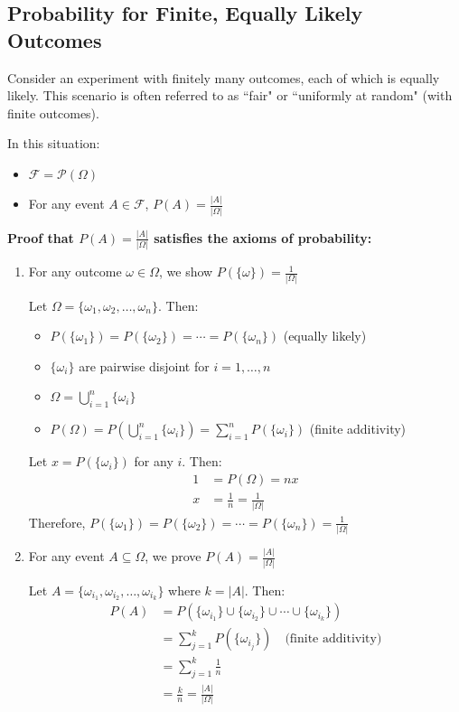 \documentclass{article}
\begin{document}
\subsection*{Probability for Finite, Equally Likely Outcomes}

Consider an experiment with finitely many outcomes, each of which is equally likely. This scenario is often referred to as ``fair" or ``uniformly at random" (with finite outcomes).

In this situation:
\begin{itemize}
    \item $\mathcal{F} = \mathcal{P}(\Omega)$
    \item For any event $A \in \mathcal{F}$, $P(A) = \frac{|A|}{|\Omega|}$
\end{itemize}

\textbf{Proof that $P(A) = \frac{|A|}{|\Omega|}$ satisfies the axioms of probability:}

\begin{enumerate}
    \item For any outcome $\omega \in \Omega$, we show $P(\{\omega\}) = \frac{1}{|\Omega|}$
    
    Let $\Omega = \{\omega_1, \omega_2, \ldots, \omega_n\}$. Then:
    \begin{itemize}
        \item $P(\{\omega_1\}) = P(\{\omega_2\}) = \cdots = P(\{\omega_n\})$ (equally likely)
        \item $\{\omega_i\}$ are pairwise disjoint for $i = 1, \ldots, n$
        \item $\Omega = \bigcup_{i=1}^{n} \{\omega_i\}$
        \item $P(\Omega) = P(\bigcup_{i=1}^{n} \{\omega_i\}) = \sum_{i=1}^{n} P(\{\omega_i\})$ (finite additivity)
    \end{itemize}
    Let $x = P(\{\omega_i\})$ for any $i$. Then:
    \begin{align*}
        1 &= P(\Omega) = nx \\
        x &= \frac{1}{n} = \frac{1}{|\Omega|}
    \end{align*}
    Therefore, $P(\{\omega_1\}) = P(\{\omega_2\}) = \cdots = P(\{\omega_n\}) = \frac{1}{|\Omega|}$

    \item For any event $A \subseteq \Omega$, we prove $P(A) = \frac{|A|}{|\Omega|}$
    
    Let $A = \{\omega_{i_1}, \omega_{i_2}, \ldots, \omega_{i_k}\}$ where $k = |A|$. Then:
    \begin{align*}
        P(A) &= P(\{\omega_{i_1}\} \cup \{\omega_{i_2}\} \cup \cdots \cup \{\omega_{i_k}\}) \\
             &= \sum_{j=1}^{k} P(\{\omega_{i_j}\}) \quad \text{(finite additivity)} \\
             &= \sum_{j=1}^{k} \frac{1}{n} \\
             &= \frac{k}{n} = \frac{|A|}{|\Omega|}
    \end{align*}
\end{enumerate}
\end{document}

